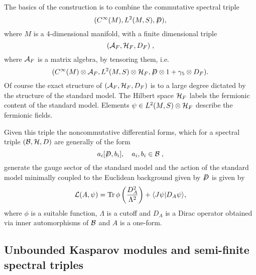 \documentclass[12pt]{article}
\def\ca{{\cal A}}
\def\cb{{\cal B}}
\def\ch{{\cal H}}
\def\cl{{\cal L}}
\newcommand{\Tr}{\operatorname{Tr}}
\begin{document}
The basics of the construction is to combine the commutative spectral triple      
\begin{equation}(C^\infty (M), L^2(M,S),  \not\hspace{-1mm}D ),\nonumber\end{equation} where $M$ is a 4-dimensional manifold, with a finite dimensional triple 
$$(\ca_F , \ch_F, D_F)\;,$$ 
where $\ca_F$ is a matrix algebra, by tensoring them, i.e.
\begin{equation}(C^\infty (M)\otimes \ca_F , L^2(M,S)\otimes \ch_F ,  \not\hspace{-1mm} D\otimes 1 +\gamma_5\otimes D_F) . \nonumber\end{equation}
Of course the exact structure of $(\ca_F , \ch_F, D_F)$ is to a large degree dictated by the structure of the standard model. The Hilbert space $\ch_F$ labels the fermionic content of the standard model. Elements $\psi \in  L^2(M,S)\otimes \ch_F$ describe the fermionic fields.

Given this triple the noncommutative differential forms, which for a spectral triple $(\cb,\ch,D)$ are generally of the form
\begin{equation}
 a_i[ \not\hspace{-1mm} D,b_i] , \quad a_i,b_i \in \cb\;,\nonumber
 \end{equation}
generate the gauge sector of the standard model and the action of the standard model minimally coupled to the Euclidean background given by $\not\hspace{-1mm} D$ is given by
\begin{equation}\cl (A,\psi ) =\Tr \phi\left( \frac{D_A^2}{\Lambda^2} \right) +\langle J\psi | D_A\psi \rangle ,\nonumber\end{equation}
where $\phi$ is a suitable function, $\Lambda$ is a cutoff and $D_A$ is a Dirac operator obtained via inner automorphisms of $\cb$ and $A$ is a one-form.  





\subsection{Unbounded Kasparov modules and semi-finite spectral triples}
\end{document}
